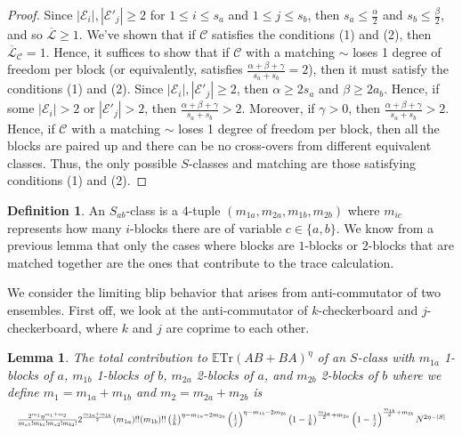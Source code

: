 \documentclass[12pt,reqno]{amsart}
\theoremstyle{plain} %
\newtheorem{lemma}[theorem]{Lemma}
\theoremstyle{remark}
\theoremstyle{definition}
\newtheorem*{defn}{Definition}
\renewcommand{\a}{\alpha}
\renewcommand{\b}{\beta}
\newcommand{\abs}[1]{\left|#1\right|}
\begin{document}
\begin{proof}
Since $\abs{\mathcal{E}_{i}},\abs{\mathcal{E}'_{j}}\geq 2$ for $1\leq i\leq s_a$ and $1\leq j\leq s_b$, then $s_a\leq \frac{\a}{2}$ and $s_b\leq \frac{\b}{2}$, and so $\mathcal{\overline{L}}\geq 1$. We've shown that if $\mathcal{C}$ satisfies the conditions (1) and (2), then $\mathcal{\overline{L}}_\mathcal{C}=1$. Hence, it suffices to show that if $\mathcal{C}$ with a matching $\sim$ loses 1 degree of freedom per block (or equivalently, satisfies $\frac{\a+\b+\gamma}{s_a+s_b}=2$), then it must satisfy the conditions (1) and (2). Since $\abs{\mathcal{E}_{i}},\abs{\mathcal{E}'_{j}}\geq 2$, then $\a\geq 2s_a$ and $\b\geq 2a_b$. Hence, if some $\abs{\mathcal{E}_{i}}>2$ or $\abs{\mathcal{E}'_{j}}> 2$, then $\frac{\a+\b+\gamma}{s_a+s_b}>2$. Moreover, if $\gamma>0$, then $\frac{\a+\b+\gamma}{s_a+s_b}>2$. Hence, if $\mathcal{C}$ with a matching $\sim$ loses 1 degree of freedom per block, then all the blocks are paired up and there can be no cross-overs from different equivalent classes. Thus, the only possible $S$-classes and matching are those satisfying conditions (1) and (2).
\end{proof}

\begin{defn}
An $S_{ab}$-class is a 4-tuple $(m_{1a},m_{2a},m_{1b},m_{2b})$ where $m_{ic}$ represents how many $i$-blocks there are of variable $c\in \{a,b\}$. We know from a previous lemma that only the cases where blocks are $1$-blocks or $2$-blocks that are matched together are the ones that contribute to the trace calculation.
\end{defn}

We consider the limiting blip behavior that arises from anti-commutator of two ensembles. First off, we look at the anti-commutator of $k$-checkerboard and $j$-checkerboard, where $k$ and $j$ are coprime to each other.

\begin{lemma}
The total contribution to $\mathbb{E}\text{Tr}(AB+BA)^\eta$ of an $S$-class with $m_{1a}$ 1-blocks of $a$, $m_{1b}$ 1-blocks of $b$, $m_{2a}$ 2-blocks of $a$, and $m_{2b}$ 2-blocks of $b$ where we define $m_1=m_{1a}+m_{1b}$ and $m_2=m_{2a}+m_{2b}$  is 
\begin{equation*}
\resizebox{1.0\hsize}{!}{$\frac{2^{m_1}\eta^{m_1+m_2}}{m_{a1}!m_{b1}!m_{a2}!m_{b2}!}2^{\frac{m_{1a}+m_{1b}}{2}}(m_{1a})!!(m_{1b})!!\left(\frac{1}{k}\right)^{\eta-m_{1a}-2m_{2a}}\left(\frac{1}{j}\right)^{\eta-m_{1b}-2m_{2b}}\left(1-\frac{1}{k}\right)^{\frac{m_{1a}}{2}+m_{2a}}\left(1-\frac{1}{j}\right)^{\frac{m_{1b}}{2}+m_{2b}}N^{2\eta-|S|}$}
\end{equation*} 
\end{lemma}
\end{document}
